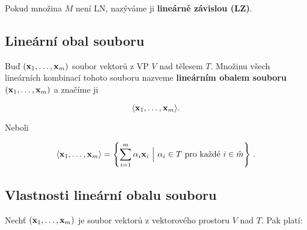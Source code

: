 \noindent Pokud množina $M$ není LN, nazýváme ji \textbf{lineárně závislou (LZ)}.

\subsection*{Lineární obal souboru}

Buď $(\mathbf{x}_{1},\dots,\mathbf{x}_{m})$ soubor vektorů z VP $V$ nad tělesem $T$. Množinu
všech lineárních kombinací tohoto souboru nazveme \textbf{lineárním obalem
      souboru} $(\mathbf{x}_{1},\dots,\mathbf{x}_{m})$ a značíme ji

\[ \langle  \mathbf{x}_{1},\dots,\mathbf{x}_{m}  \rangle . \]

\noindent Neboli

\[ \langle  \mathbf{x}_{1},\dots,\mathbf{x}_{m}  \rangle = \left\{\sum_{i=1}^m \alpha_i \mathbf{x}_i \ \Big|\ \alpha_i\in T \text{ pro každé }i \in \hat m \right\}\,. \]

\subsection*{Vlastnosti lineární obalu souboru}

Nechť $(\mathbf{x}_1,\ldots,\mathbf{x}_m)$ je soubor vektorů z vektorového prostoru $V$ nad
$T$. Pak platí:

